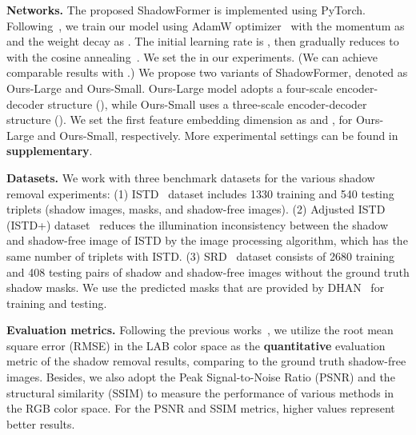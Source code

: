 \documentclass[letterpaper]{article} \usepackage{aaai23}  \usepackage{times}  \usepackage{helvet}  \usepackage{courier}  \usepackage[hyphens]{url}  \usepackage{graphicx} \urlstyle{rm} \def\UrlFont{\rm}  \usepackage{natbib}  \usepackage{caption} \frenchspacing  \setlength{\pdfpagewidth}{8.5in} \setlength{\pdfpageheight}{11in} \usepackage{algorithm}
\begin{document}
\noindent\textbf{Networks.}
The proposed ShadowFormer is implemented using PyTorch.
{Following~\cite{vaswani2017attention},  
we train our model using AdamW optimizer~\cite{loshchilov2017decoupled} with the momentum as  and the weight decay as .}
{The initial learning rate is , then gradually reduces to  with the cosine annealing~\cite{loshchilov2016sgdr}.}
We set the  in our experiments. (We can achieve comparable results with .)
{We propose two variants of ShadowFormer, 
denoted as Ours-Large and Ours-Small.}
{Ours-Large model adopts a four-scale encoder-decoder structure (), while Ours-Small uses a three-scale encoder-decoder structure ().
}
We set the first feature embedding dimension as  and , for Ours-Large and Ours-Small, respectively.
More experimental settings can be found in \textbf{supplementary}.

\noindent\textbf{Datasets.} 
{We work with three benchmark datasets for the various shadow removal experiments: }
(1) ISTD~\cite{wang2018stacked} dataset includes 1330 training and 540 testing triplets (shadow images, masks, and shadow-free images).
(2) Adjusted ISTD (ISTD+) dataset~\cite{le2019shadow} reduces the illumination inconsistency between the shadow and shadow-free image of ISTD 
by the image processing algorithm, which has the same number of triplets with ISTD.
(3) SRD~\cite{qu2017deshadownet} dataset consists of 2680 training and 408 testing pairs of shadow and shadow-free images without the ground truth shadow masks.
We use the predicted masks that are provided by DHAN~\cite{cun2020towards} for training and testing.


\noindent\textbf{Evaluation metrics.} 
Following the previous works~\cite{wang2018stacked,guo2012paired,qu2017deshadownet,le2019shadow,cun2020towards,fu2021auto}, we utilize the root mean square error (RMSE) in the LAB color space as the \textbf{quantitative} evaluation metric of the shadow removal results, comparing to the ground truth shadow-free images.
Besides, we also adopt the Peak Signal-to-Noise Ratio (PSNR) and the structural similarity (SSIM) to measure the performance of various methods in the RGB color space. For the PSNR and SSIM metrics, higher values represent better results.
\end{document}
